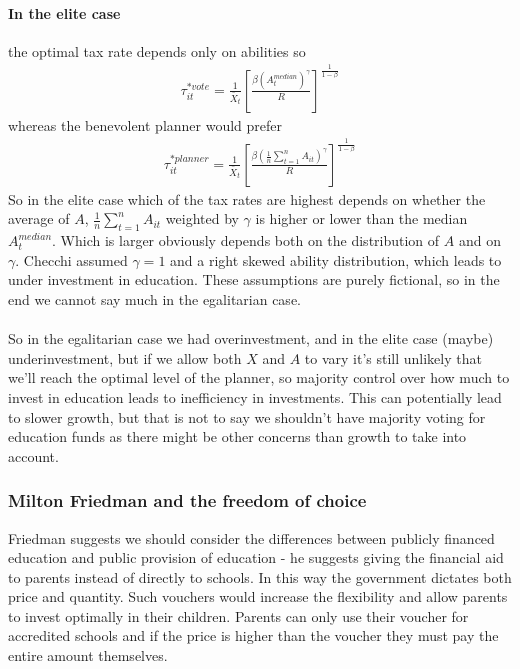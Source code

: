 \documentclass[12pt, a4paper]{article}
\begin{document}
\begin{multicols}{2}
\paragraph{In the elite case} the optimal tax rate depends only on abilities so
\begin{align*}
\tau_{it}^{*vote} = \frac{1}{\bar{X}_t} \left[ \frac{\beta (A_{t}^{median})^{\gamma}}{R} \right]^{\frac{1}{1-\beta}}
\end{align*}
whereas the benevolent planner would prefer
\begin{align*}
\tau_{it}^{*planner} = \frac{1}{\bar{X}_t} \left[ \frac{\beta (\frac{1}{n} \sum_{t=1}^n A_{it} )^{\gamma}}{R} \right]^{\frac{1}{1-\beta}}
\end{align*}
So in the elite case which of the tax rates are highest depends on whether the average of $A$, $\frac{1}{n} \sum_{t=1}^n A_{it}$ weighted by $\gamma$ is higher or lower than the median $A_{t}^{median}$. Which is larger obviously depends both on the distribution of $A$ and on $\gamma$. Checchi assumed $\gamma = 1$ and a right skewed ability distribution, which leads to under investment in education. These assumptions are purely fictional, so in the end we cannot say much in the egalitarian case.
\\ \\
So in the egalitarian case we had overinvestment, and in the elite case (maybe) underinvestment, but if we allow both $X$ and $A$ to vary it's still unlikely that we'll reach the optimal level of the planner, so majority control over how much to invest in education leads to inefficiency in investments. This can potentially lead to slower growth, but that is not to say we shouldn't have majority voting for education funds as there might be other concerns than growth to take into account.

\subsubsection{Milton Friedman and the freedom of choice}
Friedman suggests we should consider the differences between publicly financed education and public provision of education - he suggests giving the financial aid to parents instead of directly to schools. In this way the government dictates both price and quantity. Such vouchers would increase the flexibility and allow parents to invest optimally in their children. Parents can only use their voucher for accredited schools and if the price is higher than the voucher they must pay the entire amount themselves.


\end{multicols}
\end{document}
